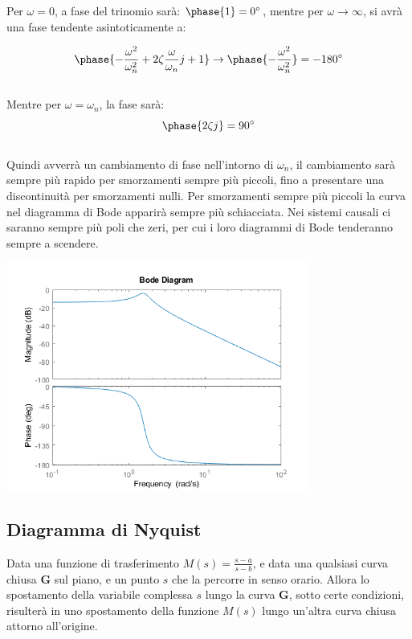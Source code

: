 \documentclass{article}
\numberwithin{equation}{subsection}
\begin{document}
Per $\omega=0$, a fase del trinomio sarà: $\phase{1}=0^{\circ}$, mentre per $\omega\to\infty$, si avrà una fase tendente asintoticamente a: 

\begin{equation}
    \phase{-\displaystyle\frac{\omega^2}{\omega_n^2}+2\zeta\frac{\omega}{\omega_n}j+1}\to\phase{-\displaystyle\frac{\omega^2}{\omega_n^2}}=-180^{\circ}
\end{equation}
\\
Mentre per $\omega=\omega_n$, la fase sarà: 
\begin{equation}
    \phase{2\zeta j}=90^{\circ}
\end{equation}
\\
Quindi avverrà un cambiamento di fase nell'intorno di $\omega_n$, il cambiamento sarà sempre più rapido per smorzamenti sempre più piccoli, fino a presentare una 
discontinuità per smorzamenti nulli. Per smorzamenti sempre più piccoli la curva nel diagramma di Bode apparirà sempre più schiacciata. 
Nei sistemi causali ci saranno sempre più poli che zeri, per cui i loro diagrammi di Bode tenderanno sempre a scendere. 
\\
\begin{center}
    \includegraphics[width=10cm]{BodeRisonanza}
\end{center}

\subsection{Diagramma di Nyquist}
Data una funzione di trasferimento $M(s)=\displaystyle\frac{s-a}{s-b}$, e data una qualsiasi curva chiusa $\mathbf{G}$ sul piano, e un punto $s$ che la percorre in senso 
orario. Allora lo spostamento della variabile complessa $s$ lungo la curva $\mathbf{G}$, sotto certe condizioni, risulterà in uno spostamento della funzione $M(s)$ lungo un'altra 
curva chiusa attorno all'origine. 
\end{document}
